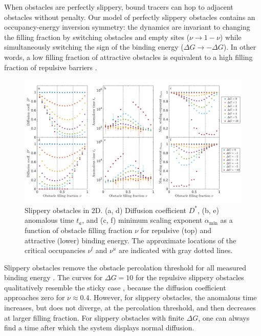 When obstacles are perfectly slippery, bound tracers can hop to adjacent
obstacles without penalty.  Our model of perfectly slippery obstacles contains
an occupancy-energy inversion symmetry: the dynamics are invariant to changing
the filling fraction by switching obstacles and empty sites ($ \nu \rightarrow
1-\nu $) while simultaneously switching the sign of the binding energy ($ \Delta
G \rightarrow - \Delta G $). In other words, a low filling fraction of
attractive obstacles is equivalent to a high filling fraction of repulsive
barriers .

\begin{figure}[!ht]
  \begin{center}
	  \includegraphics[width=150mm]{figs/ch02_soft/soft_slippery_2d.png}
  \end{center}
	\caption[Slippery diffusion in 2D]
    {Slippery obstacles in 2D. (a, d) Diffusion coefficient
    $D^*$, (b, e) anomalous time $ t_a $, and (c, f) minimum scaling
    exponent $\alpha_{\min}$ as a function of obstacle filling
    fraction $\nu$ for repulsive (top) and attractive (lower) binding
    energy.  The approximate locations of the critical occupancies
    $ \nu^l $ and $ \nu^u $ are indicated with gray dotted lines.}\label{fig:slippery_2d}
\end{figure}

Slippery obstacles remove the obstacle percolation threshold for all measured
binding energy . The curves for $\Delta G = 10$ for the
repulsive slippery obstacles qualitatively resemble the sticky case
, because the diffusion coefficient approaches zero for
$\nu \approx 0.4 $. However, for slippery obstacles, the anomalous time
increases, but does not diverge, at the percolation threshold, and then
decreases at larger filling fraction. For slippery obstacles with finite $\Delta
G$, one can always find a time after which the system displays normal diffusion.

